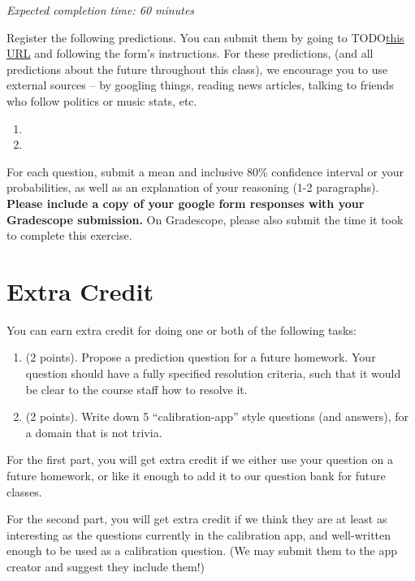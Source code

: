 \documentclass[11pt]{article}
\begin{document}
\emph{Expected completion time: 60 minutes}

Register the following predictions. You can submit them by going to TODO\href{URL}{this URL} and following the form's instructions. For these predictions, (and all predictions about the future throughout this class), we encourage you to use external sources -- by googling things, reading news articles, talking to friends who follow politics or music stats, etc.

\begin{enumerate}
	\item 
	\item 
\end{enumerate}

For each question, submit a mean and inclusive 80\% confidence interval or your probabilities, as well as an explanation of your reasoning (1-2 paragraphs). \textbf{Please include a copy of your google form responses with your Gradescope submission.} On Gradescope, please also submit the time it took to complete this exercise.

\section*{Extra Credit}

You can earn extra credit for doing one or both of the following tasks:
\begin{enumerate}
\item (2 points). Propose a prediction question for a future homework. Your question should have a fully specified resolution criteria, 
      such that it would be clear to the course staff how to resolve it.
\item (2 points). Write down 5 ``calibration-app'' style questions (and answers), for a domain that is not trivia.
\end{enumerate}

For the first part, you will get extra credit if we either use your question on a future homework, 
or like it enough to add it to our question bank for future classes.

For the second part, you will get extra credit if we think they are at least as interesting as the 
questions currently in the calibration app, and well-written enough to be used as a calibration question. 
(We may submit them to the app creator and suggest they include them!)
\end{document}

